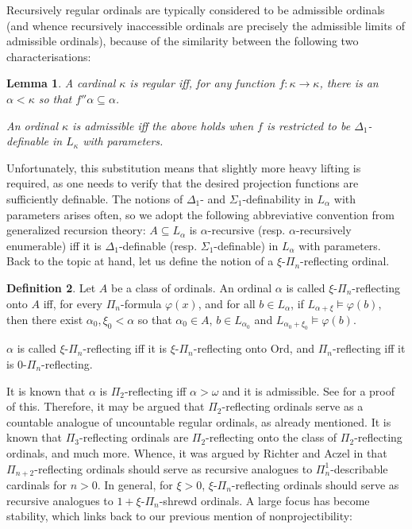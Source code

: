 \documentclass{article}
\newcommand{\Ord}{\mathrm{Ord}}
\theoremstyle{definition}
\newtheorem{definition}{Definition}[section]
\theoremstyle{plain}
\theoremstyle{plain}
\theoremstyle{plain}
\theoremstyle{plain}
\theoremstyle{remark}
\theoremstyle{remark}
\theoremstyle{remark}
\theoremstyle{plain}
\newtheorem{lemma}[definition]{Lemma}
\theoremstyle{plain}
\theoremstyle{plain}
\begin{document}
Recursively regular ordinals are typically considered to be admissible ordinals (and whence recursively inaccessible ordinals are precisely the admissible limits of admissible ordinals), because of the similarity between the following two characterisations:

\begin{lemma}
A cardinal $\kappa$ is regular iff, for any function $f: \kappa \to \kappa$, there is an $\alpha < \kappa$ so that $f''\alpha \subseteq \alpha$.

An ordinal $\kappa$ is admissible iff the above holds when $f$ is restricted to be $\Delta_1$-definable in $L_\kappa$ with parameters.
\end{lemma}

Unfortunately, this substitution means that slightly more heavy lifting is required, as one needs to verify that the desired projection functions are sufficiently definable. The notions of $\Delta_1$- and $\Sigma_1$-definability in $L_\alpha$ with parameters arises often, so we adopt the following abbreviative convention from generalized recursion theory: $A \subseteq L_\alpha$ is $\alpha$-recursive (resp. $\alpha$-recursively enumerable) iff it is $\Delta_1$-definable (resp. $\Sigma_1$-definable) in $L_\alpha$ with parameters. Back to the topic at hand, let us define the notion of a $\xi$-$\Pi_n$-reflecting ordinal.

\begin{definition}
\label{ReflectingOrdinal}
Let $A$ be a class of ordinals. An ordinal $\alpha$ is called $\xi$-$\Pi_n$-reflecting onto $A$ iff, for every $\Pi_n$-formula $\varphi(x)$, and for all $b \in L_\alpha$, if $L_{\alpha+\xi} \models \varphi(b)$, then there exist $\alpha_0, \xi_0 < \alpha$ so that $\alpha_0 \in A$, $b \in L_{\alpha_0}$ and $L_{\alpha_0+\xi_0} \models \varphi(b)$.

$\alpha$ is called $\xi$-$\Pi_n$-reflecting iff it is $\xi$-$\Pi_n$-reflecting onto $\Ord$, and $\Pi_n$-reflecting iff it is $0$-$\Pi_n$-reflecting.
\end{definition}

It is known that $\alpha$ is $\Pi_2$-reflecting iff $\alpha > \omega$ and it is admissible. See \cite{arai} for a proof of this. Therefore, it may be argued that $\Pi_2$-reflecting ordinals serve as a countable analogue of uncountable regular ordinals, as already mentioned. It is known that $\Pi_3$-reflecting ordinals are $\Pi_2$-reflecting onto the class of $\Pi_2$-reflecting ordinals, and much more. Whence, it was argued by Richter and Aczel in \cite{richter} that $\Pi_{n+2}$-reflecting ordinals should serve as recursive analogues to $\Pi^1_n$-describable cardinals for $n > 0$. In general, for $\xi > 0$, $\xi$-$\Pi_n$-reflecting ordinals should serve as recursive analogues to $1+\xi$-$\Pi_n$-shrewd ordinals. A large focus has become stability, which links back to our previous mention of nonprojectibility:
\end{document}
